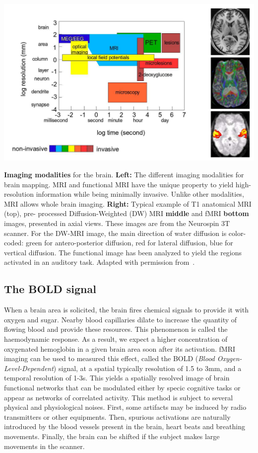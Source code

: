 \begin{pagefigure}%
  \includegraphics[width=1\linewidth]{figures/modalities.png}
  \caption{\textbf{Imaging modalities} for the brain. \textbf{Left:} The different imaging modalities for brain mapping.
      MRI and functional MRI have
the unique property to yield high-resolution information while being minimally invasive. Unlike other
modalities, MRI allows whole brain imaging. \textbf{Right:} Typical example of T1 anatomical MRI (top), pre-
processed Diffusion-Weighted (DW) MRI \textbf{middle} and fMRI \textbf{bottom} images, presented in axial views.
These images are from the Neurospin 3T scanner. For the DW-MRI image,
the main direction of water diffusion is color-coded: green for antero-posterior diffusion, red for lateral
diffusion, blue for vertical diffusion. The functional image has been analyzed to yield the regions activated
in an auditory task. Adapted with permission from~\citep{thirion_hdr}.}
\end{pagefigure}

\subsection{The BOLD signal}
When a brain area is solicited, the brain fires chemical signals to provide it
with oxygen and sugar. Nearby blood capillaries dilate to increase the quantity
of flowing blood and provide these resources. This phenomenon is called the
haemodynamic response.
As a result, we expect a higher concentration of oxygenated hemoglobin
in a given brain area soon after its activation.
fMRI imaging can be used to measured this effect, called the BOLD (\textit{Blood Oxygen-Level-Dependent}) signal, at a spatial typically resolution of 1.5 to 3mm, and a temporal resolution
of 1-3s. This yields a spatially resolved image of
brain functional networks that can be modulated
either by specic cognitive tasks or appear as
networks of correlated activity. This method is subject to several physical and physiological
noises. First,
some artifacts may be induced by radio transmitters or other equipments. Then,
spurious activations are naturally introduced by the blood vessels present in
the brain, heart beats and breathing movements. Finally, the brain can be
shifted if the subject makes large movements in the scanner.

